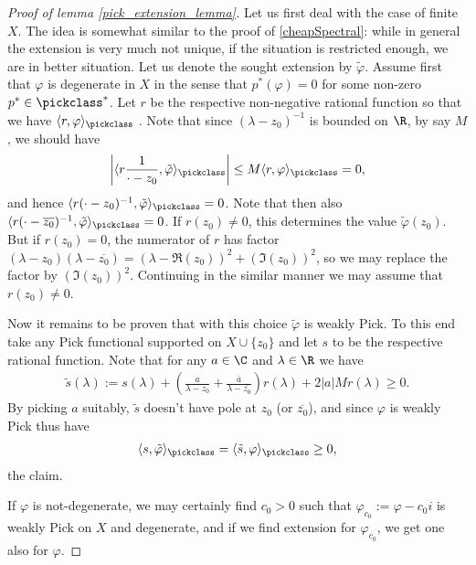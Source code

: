 \begin{proof}[Proof of lemma \ref{pick_extension_lemma}]
	Let us first deal with the case of finite $X$. The idea is somewhat similar to the proof of \ref{cheapSpectral}: while in general the extension is very much not unique, if the situation is restricted enough, we are in better situation. Let us denote the sought extension by $\tilde{\varphi}$. Assume first that $\varphi$ is degenerate in $X$ in the sense that $p^{*}(\varphi) = 0$ for some non-zero $p^{*} \in \pickclass^{*}$. Let $r$ be the respective non-negative rational function so that we have $\langle r, \varphi \rangle_{\pickclass}$ . Note that since $(\lambda - z_{0})^{-1}$ is bounded on $\R$, by say $M$, we should have
	\begin{align*}
		\left|\langle r \frac{1}{\cdot - z_{0}}, \tilde{\varphi} \rangle_{\pickclass}\right| \leq M \langle r , \varphi \rangle_{\pickclass} = 0,
	\end{align*}
	and hence $\langle r (\cdot - z_{0})^{-1}, \tilde{\varphi} \rangle_{\pickclass} = 0$. Note that then also $\langle r (\cdot - \overline{z_{0}})^{-1}, \tilde{\varphi} \rangle_{\pickclass} = 0$. If $r(z_{0}) \neq 0$, this determines the value $\tilde{\varphi}(z_{0})$. But if $r(z_{0}) = 0$, the numerator of $r$ has factor $(\lambda - z_{0}) (\lambda - \overline{z_{0}}) = (\lambda - \Re(z_{0}))^2 + (\Im(z_{0}))^2$, so we may replace the factor by $(\Im(z_{0}))^2$. Continuing in the similar manner we may assume that $r(z_{0}) \neq 0$.

	Now it remains to be proven that with this choice $\tilde{\varphi}$ is weakly Pick. To this end take any Pick functional supported on $X \cup \{z_{0}\}$ and let $s$ to be the respective rational function. Note that for any $a \in \C$ and $\lambda \in \R$ we have
	\begin{align*}
		\tilde{s}(\lambda) := s(\lambda) + \left(\frac{a}{\lambda - z_{0}} + \frac{\overline{a}}{\lambda - \overline{z_{0}}}\right) r(\lambda) + 2 |a| M r(\lambda) \geq 0.
	\end{align*}
	By picking $a$ suitably, $\tilde{s}$ doesn't have pole at $z_{0}$ (or $\overline{z_{0}}$), and since $\varphi$ is weakly Pick thus have
	\begin{align*}
		\langle s, \tilde{\varphi} \rangle_{\pickclass} = \langle \tilde{s}, \varphi \rangle_{\pickclass} \geq 0,
	\end{align*}
	the claim.

	If $\varphi$ is not-degenerate, we may certainly find $c_{0} > 0$ such that $\varphi_{c_{0}} := \varphi - c_{0} i$ is weakly Pick on $X$ and degenerate, and if we find extension for $\varphi_{c_{0}}$, we get one also for $\varphi$.


\end{proof}
